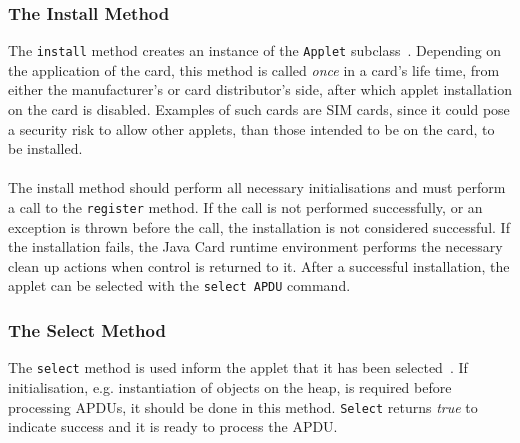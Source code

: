 \subsubsection{The Install Method}\label{subsec:jcinstall}
The \texttt{install} method creates an instance of the \texttt{Applet} subclass~\cite[API p. 65]{java_card_spec}. Depending on the application of the card, this method is called \textit{once} in a card's life time, from either the manufacturer's or card distributor's side, after which applet installation on the card is disabled. Examples of such cards are SIM cards, since it could pose a security risk to allow other applets, than those intended to be on the card, to be installed.\\\\
The install method should perform all necessary initialisations and must perform a call to the \texttt{register} method. If the call is not performed successfully, or an exception is thrown before the call, the installation is not considered successful. If the installation fails, the Java Card runtime environment performs the necessary clean up actions when control is returned to it. After a successful installation, the applet can be selected with the \texttt{select APDU} command.


\subsubsection{The Select Method}\label{subsec:jcselect}
The \texttt{select} method is used inform the applet that it has been selected~\cite[API p. 68]{java_card_spec}. If initialisation, e.g. instantiation of objects on the heap, is required before processing APDUs, it should be done in this method. \texttt{Select} returns \textit{true} to indicate success and it is ready to process the APDU.